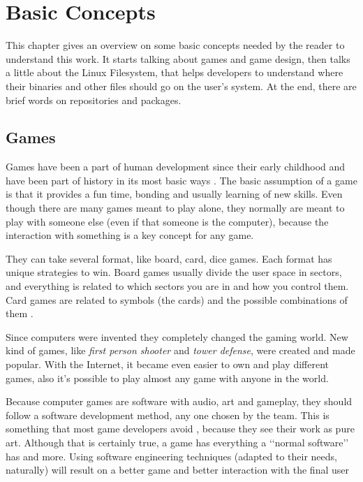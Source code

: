 \chapter{Basic Concepts}
\label {sec:basic_concepts}

This chapter gives an overview on some basic concepts needed by the reader to understand this work. It starts talking about games and game design, then talks a little about the Linux Filesystem, that helps developers to understand where their binaries and other files should go on the user's system. At the end, there are brief words on repositories and packages.

\section{Games}
\label {sec:games}


Games have been a part of human development since their early childhood and have been part of history in its most basic ways \cite{bethke2003game}. The basic assumption of a game is that it provides a fun time, bonding and usually learning of new skills. Even though there are many games meant to play alone, they normally are meant to play with someone else (even if that someone is the computer), because the interaction with something is a key concept for any game.

They can take several format, like board, card, dice games. Each format has unique strategies to win. Board games usually divide the user space in sectors, and everything is related to which sectors you are in and how you control them. Card games are related to symbols (the cards) and the possible combinations of them \cite{crawford1984art}.

Since computers were invented they completely changed the gaming world. New kind of games, like \textit{first person shooter} and \textit{tower defense}, were created and made popular. With the Internet, it became even easier to own and play different games, also it's possible to play almost any game with anyone in the world.

Because computer games are software with audio, art and gameplay, they should follow a software development method, any one chosen by the team. This is something that most game developers avoid \cite{bethke2003game}, because they see their work as pure art. Although that is certainly true, a game has everything a \lq\lq normal software\rq\rq{} has and more. Using software engineering techniques (adapted to their needs, naturally) will result on a better game and better interaction with the final user \cite{pressman2009software}

